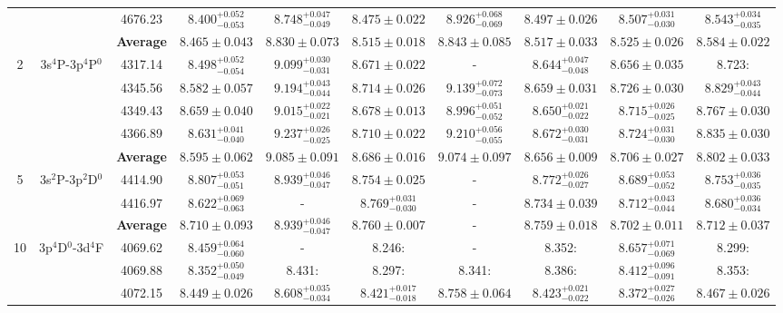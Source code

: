 \documentclass[fleqn,usenatbib]{mnras}
\begin{document}
\begin{sidewaystable*}
\begin{tabular}{cccccccccc}
&&4676.23 & $8.400^{+0.052} _{-0.053}$ &  $8.748^{+0.047} _{-0.049}$ & $8.475 \pm 0.022$ & $8.926^{+0.068} _{-0.069}$ & $8.497 \pm 0.026$ & $8.507^{+0.031} _{-0.030}$ & $8.543^{+0.034} _{-0.035}$   \\
&&\textbf{Average} & \boldmath$8.465 \pm 0.043$ & \boldmath$8.830 \pm 0.073$ & \boldmath$8.515 \pm 0.018$ & \boldmath$8.843 \pm 0.085$ & \boldmath$8.517 \pm 0.033$&\boldmath$8.525 \pm 0.026$ &\boldmath$8.584 \pm 0.022$\\
2& 3s$^{4}$P-3p$^{4}$P$^{0}$  &4317.14 & $8.498^{+0.052} _{-0.054}$ & $9.099^{+0.030} _{-0.031}$ & $8.671 \pm 0.022$ &-& $8.644^{+0.047} _{-0.048}$ & $8.656 \pm 0.035$ & 8.723: \\
&&4345.56 & $8.582 \pm 0.057$ & $9.194^{+0.043} _{-0.044}$ & $8.714 \pm 0.026$ & $9.139^{+0.072} _{-0.073}$ & $8.659 \pm 0.031$ & $8.726 \pm 0.030$ & $8.829^{+0.043} _{-0.044}$  \\
&&4349.43 & $8.659 \pm 0.040$ & $9.015^{+0.022} _{-0.021}$ & $8.678 \pm 0.013$ & $8.996^{+0.051} _{-0.052}$  & $8.650^{+0.021} _{-0.022}$ & $8.715^{+0.026} _{-0.025}$ & $8.767 \pm 0.030$  \\
&&4366.89 & $8.631^{+0.041} _{-0.040}$ &  $9.237^{+0.026} _{-0.025}$ & $8.710 \pm 0.022$ &$9.210^{+0.056} _{-0.055}$& $8.672^{+0.030} _{-0.031}$ & $8.724^{+0.031} _{-0.030}$ & $8.835 \pm 0.030$  \\
&&\textbf{Average} & $8.595 \pm 0.062$  &  $9.085 \pm 0.091$ &$8.686 \pm 0.016$& $9.074 \pm 0.097$  & $8.656 \pm 0.009$&$8.706 \pm 0.027$&$8.802 \pm 0.033$\\
5& 3s$^{2}$P-3p$^{2}$D$^{0}$  &4414.90 &$8.807^{+0.053} _{-0.051}$& $8.939^{+0.046} _{-0.047}$ & $8.754 \pm 0.025$ &-& $8.772^{+0.026} _{-0.027}$  & $8.689^{+0.053} _{-0.052}$ & $8.753^{+0.036} _{-0.035}$   \\
&&4416.97&$8.622^{+0.069} _{-0.063}$ &- & $8.769^{+0.031} _{-0.030}$ & -& $8.734 \pm 0.039$ & $8.712^{+0.043} _{-0.044}$ & $8.680^{+0.036} _{-0.034}$  \\
&&\textbf{Average} & $8.710 \pm 0.093$ & $8.939^{+0.046} _{-0.047}$  &$8.760 \pm 0.007$&-&$8.759 \pm 0.018$&$8.702 \pm 0.011$&$8.712 \pm 0.037$\\
10& 3p$^{4}$D$^{0}$-3d$^{4}$F  &4069.62 & $8.459^{+0.064} _{-0.060}$& -& 8.246: &-& 8.352:  & $8.657^{+0.071} _{-0.069}$ & 8.299:  \\
&&4069.88 & $8.352^{+0.050} _{-0.049}$ & 8.431: &8.297: & 8.341: &8.386: & $8.412^{+0.096} _{-0.091}$ & 8.353: \\
&&4072.15 & $8.449 \pm 0.026$ & $8.608^{+0.035} _{-0.034}$ & $8.421^{+0.017} _{-0.018}$ &  $8.758 \pm 0.064$  & $8.423^{+0.021} _{-0.022}$ & $8.372^{+0.027} _{-0.026}$ & $8.467 \pm 0.026$  \\

\end{tabular}
\end{sidewaystable*}
\end{document}
